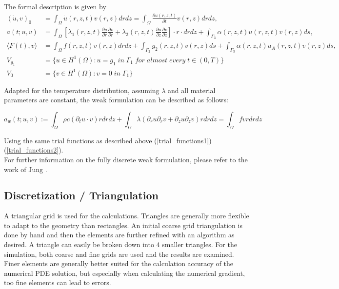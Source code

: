 \documentclass[parskip=half, titlepage=yes, 12pt, BCOR=12mm, DIV=calc]{scrartcl}
\begin{document}
The formal description is given by 
\begin{align*}
    (\Dot{u},v)_0 &= \int_{\Omega} \Dot{u}(r,z,t)v(r,z) drdz = \int_{\Omega} \frac{\partial u(r,z,t)}{\partial t} v(r,z) drdz, \\
    a(t;u,v) &= \int_{\Omega} \left[ \lambda_1(r,z,t) \frac{\partial u}{\partial r} \frac{\partial v}{\partial r} + \lambda_2(r,z,t) \frac{\partial u}{\partial z} \frac{\partial v}{\partial z} \right] \cdot r \cdot drdz + \int_{\Gamma_3} \alpha(r,z,t)u(r,z,t)v(r,z) ds, \\
    \langle F(t),v \rangle &= \int_{\Omega} f(r,z,t)v(r,z) drdz + \int_{\Gamma_2} g_2(r,z,t)v(r,z) ds + \int_{\Gamma_3} \alpha(r,z,t)u_A(r,z,t)v(r,z) ds, \\
    V_{g_1} &= \{u \in H^1(\Omega) : u = g_1 \; in \;  \Gamma_1 \; for \; almost \; every \; t \in (0,T) \} \\
    V_0 &= \{ v \in H^1(\Omega) : v = 0 \; in \; \Gamma_1 \}
\end{align*}

Adapted for the temperature distribution, assuming $\lambda$ and all material parameters are constant, the weak formulation can be described as follows: 

\begin{equation}
    a_w(t;u,v) := \int_{\Omega} \rho c (\partial_t u \cdot v) r drdz + \int_{\Omega} \lambda (\partial_r u \partial_r v + \partial_z u \partial_z v) r drdz = \int_{\Omega} f v r dr dz
\end{equation}

Using the same trial functions as described above (\ref{trial_functions1}) (\ref{trial_functions2}).  \\

For further information on the fully discrete weak formulation, please refer to the work of Jung \cite{jung}.


\subsection{Discretization / Triangulation}

A triangular grid is used for the calculations. Triangles are generally more flexible to adapt to the geometry than rectangles. An initial coarse grid triangulation is done by hand and then the elements are further refined with an algorithm as desired. A triangle can easily be broken down into 4 smaller triangles. For the simulation, both coarse and fine grids are used and the results are examined. Finer elements are generally better suited for the calculation accuracy of the numerical PDE solution, but especially when calculating the numerical gradient, too fine elements can lead to errors. 
\end{document}
